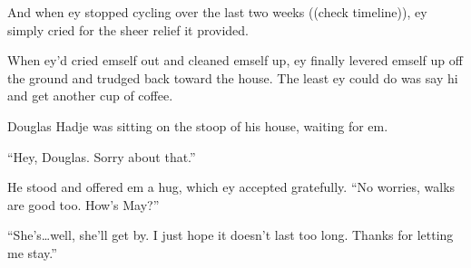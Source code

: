And when ey stopped cycling over the last two weeks ((check timeline)), ey simply cried for the sheer relief it provided.

When ey'd cried emself out and cleaned emself up, ey finally levered emself up off the ground and trudged back toward the house. The least ey could do was say hi and get another cup of coffee.

Douglas Hadje was sitting on the stoop of his house, waiting for em.

``Hey, Douglas. Sorry about that.''

He stood and offered em a hug, which ey accepted gratefully. ``No worries, walks are good too. How's May?''

``She's\ldots well, she'll get by. I just hope it doesn't last too long. Thanks for letting me stay.''
